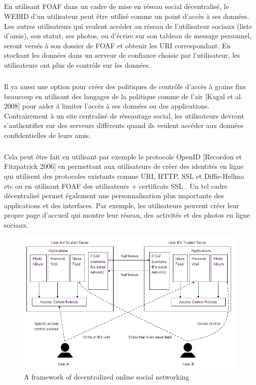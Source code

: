 \subparagraph{}
En utilisant FOAF dans un cadre de mise en réseau social décentralisé, le WEBID d'un utilisateur peut être utilisé comme un point d'accès à ses données. Les autres utilisateurs qui veulent accéder au réseau de l'utilisateur sociaux (liste d'amis), son statut, ses photos, ou d'écrire sur son tableau de message personnel, seront versés à son dossier de FOAF et obtenir les URI correspondant. En stockant les données dans un serveur de confiance choisie par l'utilisateur, les utilisateurs ont plus de contrôle sur les données. 
\subparagraph{}
Il ya aussi une option pour créer des politiques de contrôle d'accès à grains fins beaucoup en utilisant des langages de la politique comme de l'air [Kagal et al. 2008] pour aider à limiter l'accès à ses données ou des applications. Contrairement à un site centralisé de réseautage social, les utilisateurs devront s'authentifier sur des serveurs différents quand ils veulent accéder aux données confidentielles de leurs amis. 
\subparagraph{}
Cela peut être fait en utilisant par exemple le protocole OpenID [Recordon et Fitzpatrick 2006] en permettant aux utilisateurs de créer des identités en ligne qui utilisent des protocoles existants comme URI, HTTP, SSL et Diffie-Hellma etc ou en utilisant FOAF des utilisateurs + certificats SSL . Un tel cadre décentralisé permet également une personnalisation plus importante des applications et des interfaces. Par exemple, les utilisateurs peuvent créer leur propre page d'accueil qui montre leur réseau, des activités et des photos en ligne sociaux.
\begin{figure}
        \centering
                \centering
                \includegraphics[width=\textwidth]{framework.png}
                \caption{A framework of decentralized online social networking}
                \label{fig:A framework of decentralized online social networking}
       
\end{figure}
\newpage
